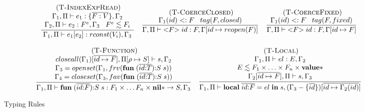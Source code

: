 \documentclass[10pt]{sigplanconf}
\newcommand{\Value}{\mathbf{value}}
\newcommand{\Nil}{\mathbf{nil}}
\newcommand{\Void}{\Nil{*}}
\newcommand{\mylabel}[1]{\; (\textsc{#1})}
\newcommand{\env}{\Gamma}
\newcommand{\penv}{\Pi}
\newcommand{\subtype}{<:}
\newcommand{\ret}{\rho}
\begin{document}
\begin{figure*}[t]
{\[\begin{array}{c}
\begin{array}{c}
\mylabel{T-IndexExpRead}\\
\dfrac{\begin{array}{c}
	\env_{1}, \penv \vdash e_{1}:\{\overline{F:V}\}, \env_{2}\\
	\env_{2}, \penv \vdash e_{2}:F^e, \env_{3} \;\;\;
	 F^e \lesssim F_{i}
	\end{array}}
{\env_{1}, \penv \vdash e_{1}[e_{2}]:rconst(V_{i}), \env_{3}}
\end{array}
\begin{array}{c}
\mylabel{T-CoerceClosed}\\
\dfrac{\env_{1}(id) \subtype F \;\;\; tag(F,closed)}
{\env, \penv \vdash {<}F{>} \; id:F, \env[id \mapsto reopen(F)]}
\end{array}
\begin{array}{c}
\mylabel{T-CoerceFixed}\\
\dfrac{\env_{1}(id) \subtype F \;\;\; tag(F,fixed)}
{\env, \penv \vdash {<}F{>} \; id:F, \env[id \mapsto F]}
\end{array}\\\\
\begin{array}{c}
\mylabel{T-Function}\\
\dfrac{\begin{array}{c}
	closeall(\env_{1})[\overline{id \mapsto F}], \penv[\ret \mapsto S] \vdash s, \env_{2}\\
	\env_{3} = openset(\env_{1}, frv(\mathbf{fun} \; (\overline{id{:}T}){:}S \; s)) \\
	\env_{4} = closeset(\env_{3}, fav(\mathbf{fun} \; (\overline{id{:}T}){:}S \; s))
	\end{array}}
{\env_{1}, \penv \vdash \mathbf{fun} \; (\overline{id{:}F}){:}S \; s:F_1 \times \ldots F_n \times \Void \rightarrow S, \env_{3}}
\end{array}
\begin{array}{c}
\mylabel{T-Local}\\
\dfrac{\begin{array}{c}
	\env_{1}, \penv \vdash el:E, \env_{2} \\
	E \lesssim F_1 \times \ldots \times F_n \times \Value{*} \\
	\env_{2}[\overline{id \mapsto F}], \penv \vdash s, \env_{3}
	\end{array}}
{\env_{1}, \penv \vdash \mathbf{local} \; \overline{id{:}F} = el \; \mathbf{in} \; s, (\env_{3} - \{\overline{id}\})[\overline{id \mapsto \env_2(id)}]}
\end{array}
\end{array}
\]
}
\caption{Typing Rules}
\label{fig:tablerules}
\end{figure*}
\end{document}

